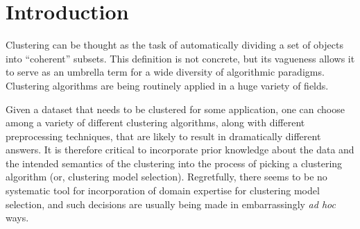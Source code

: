 \documentclass[letterpaper,12pt,titlepage,oneside,final]{book}
\begin{document}
 

\chapter{Introduction}
Clustering can be thought as the task of automatically dividing a set of objects into ``coherent'' subsets. This definition is not concrete, but its vagueness allows it to serve as an umbrella term for a wide diversity of algorithmic paradigms. Clustering algorithms are being routinely applied in a huge variety of fields. 


Given a dataset that needs to be clustered for some application, one can choose among a variety of different clustering algorithms, along with different preprocessing techniques, that are likely to result in dramatically different answers. It is therefore critical to incorporate prior knowledge about the data and the intended semantics of the clustering into the process of picking a clustering algorithm (or, clustering model selection). Regretfully, there seems to be no systematic tool for incorporation of domain expertise for clustering model selection, and such decisions are usually being made in embarrassingly  \textit{ad hoc} ways.
\end{document}
